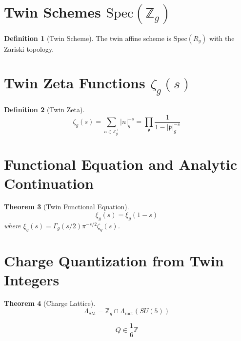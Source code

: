 \documentclass[11pt,a4paper,openright]{book}
\theoremstyle{plain}
\newtheorem{theorem}{Theorem}[chapter]
\theoremstyle{definition}
\newtheorem{definition}[theorem]{Definition}
\newcommand{\SM}{\mathrm{SM}}
\newcommand{\Spec}{\mathrm{Spec}}
\newcommand{\Z}{\mathbb{Z}}
\begin{document}
\section{Twin Schemes $\Spec(\Z_g)$}

\begin{definition}[Twin Scheme]
The twin affine scheme is $\Spec(R_g)$ with the Zariski topology.
\end{definition}

\section{Twin Zeta Functions $\zeta_g(s)$}

\begin{definition}[Twin Zeta]
\begin{equation}
\zeta_g(s) = \sum_{n \in \Z_g^+} |n|_g^{-s} = \prod_{\mathfrak{p}} \frac{1}{1 - |\mathfrak{p}|_g^{-s}}
\end{equation}
\end{definition}

\section{Functional Equation and Analytic Continuation}

\begin{theorem}[Twin Functional Equation]
\begin{equation}
\xi_g(s) = \xi_g(1-s)
\end{equation}
where $\xi_g(s) = \Gamma_g(s/2) \pi^{-s/2} \zeta_g(s)$.
\end{theorem}

\section{Charge Quantization from Twin Integers}

\begin{theorem}[Charge Lattice]
\begin{equation}
\Lambda_{\SM} = \Z_g \cap \Lambda_{\mathrm{root}}(SU(5))
\end{equation}
\end{theorem}

\begin{mainresult}
\begin{equation}
\boxed{Q \in \frac{1}{6}\Z}
\end{equation}
\end{mainresult}
\end{document}
